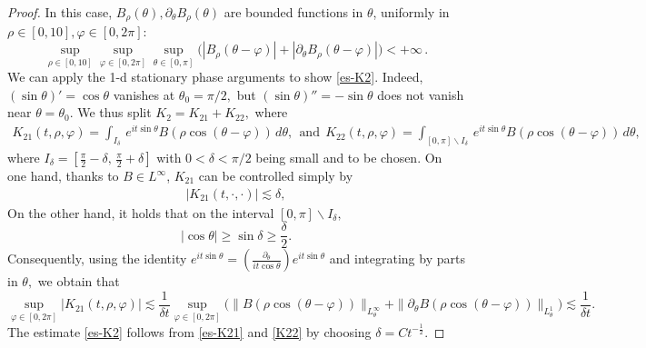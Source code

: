\documentclass[11pt,reqno]{article}
\newcommand{\beq}{\begin{equation}}
\newcommand{\eeq}{\end{equation}}
\newcommand{\beqs}{\begin{equation*}}
\newcommand{\eeqs}{\end{equation*}}
\numberwithin{equation}{section}
\let\pa=\partial
\begin{document}
\begin{appendices}
\begin{proof}
	
	In this case, 
	\( B_{\rho}(\theta), \partial_\theta B_{\rho}(\theta) \)  are  bounded functions in \( \theta \), uniformly in \( \rho \in [0,10], \varphi\in [0,2\pi]\): 
	\beq \label{unies-B}
	\sup_{\rho\in[0,10]}\sup_{\varphi\in  [0,2\pi]}\sup_{\theta\in[0,\pi]} \Big(|B_{\rho}(\theta-\varphi)|+|\pa_{\theta} B_{\rho}(\theta-\varphi)|\Big)
	<+\infty\,.
	\eeq\fi
	We can apply the 1-d stationary phase arguments to show \eqref{es-K2}.
	Indeed, $(\sin\theta)'=\cos\theta$ vanishes at 
	$\theta_0=\pi/2,$ but $(\sin\theta)''=-\sin\theta$ does not vanish near $\theta=\theta_0.$ 
	We thus split $K_2=K_{21}+K_{22},$ where 
	\begin{align*}
		K_{21}(t,\rho,\varphi)=\int %
		_{I_{\delta}}\, e^{it \sin\theta} B(\rho \cos (\theta-\varphi)) \, d\theta,
        ~~\text{and}
		~~  
        K_{22}(t,\rho,\varphi)=%
		\int_{[0,\pi]\backslash I_{\delta}}\, e^{it \sin\theta} B(\rho \cos (\theta-\varphi)) \,d\theta, 
	\end{align*}
	where $I_{\delta}=[\frac{\pi}{2}-\delta,\, \frac{\pi}{2}+\delta]$ with
	$0<\delta<\pi/2$ being small and to be chosen. 
	On one hand, thanks to $B\in L^{\infty}$, 
	$K_{21}$ can be controlled simply by 
	\begin{align}\label{es-K21}
		|K_{21}(t,\cdot,\cdot)| \lesssim \delta, 
	\end{align}
	On the other hand, it holds that on the interval $[0,\pi]\backslash I_{\delta},$ 
	\beqs 
	|\cos\theta|\geq \sin\delta\geq \frac{\delta}{2}.
	\eeqs
	Consequently, using the identity $e^{it\sin\theta}=(\frac{\partial_{\theta}}{i t \cos\theta})e^{it\sin\theta}$ and integrating by parts in $\theta,$ we obtain that %
	\beq\label{K22}
	\sup_{\varphi\in  [0,2\pi]}  |K_{21}(t,\rho,\varphi)| \lesssim  \frac{1}{\delta t} \sup_{\varphi\in  [0,2\pi]}  
	\big(\|B(\rho \cos (\theta-\varphi))\|_{L_{\theta}^{\infty}}+\|\pa_{\theta}B(\rho \cos (\theta-\varphi))\|_{L_{\theta}^{1}}\big)
	\lesssim  \frac{1}{\delta t}.
	\eeq
	The estimate \eqref{es-K2} follows from 
	\eqref{es-K21} and \eqref{K22} by choosing $\delta=Ct^{-\frac12}$. 
\end{proof}


\end{appendices}
\end{document}
